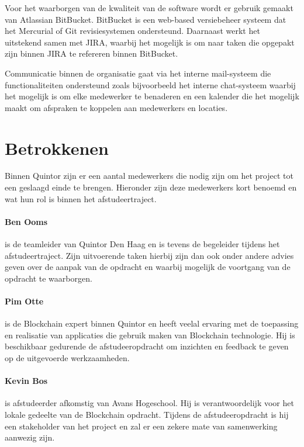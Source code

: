 Voor het waarborgen van de kwaliteit van de software wordt er gebruik gemaakt van Atlassian BitBucket. BitBucket is een web-based versiebeheer systeem dat het Mercurial of Git revisiesystemen ondersteund. Daarnaast werkt het uitstekend samen met JIRA, waarbij het mogelijk is om naar taken die opgepakt zijn binnen JIRA te refereren binnen BitBucket.

Communicatie binnen de organisatie gaat via het interne mail-systeem die functionaliteiten ondersteund zoals bijvoorbeeld het interne chat-systeem waarbij het mogelijk is om elke medewerker te benaderen en een kalender die het mogelijk maakt om afspraken te koppelen aan medewerkers en locaties.

\section{Betrokkenen}

Binnen Quintor zijn er een aantal medewerkers die nodig zijn om het project tot een geslaagd einde te brengen. Hieronder zijn deze medewerkers kort benoemd en wat hun rol is binnen het afstudeertraject.

\paragraph{Ben Ooms} \label{begeleider} is de teamleider van Quintor Den Haag en is tevens de begeleider tijdens het afstudeertraject. Zijn uitvoerende taken hierbij zijn dan ook onder andere advies geven over de aanpak van de opdracht en waarbij mogelijk de voortgang van de opdracht te waarborgen.

\paragraph{Pim Otte} \label{expert} is de Blockchain expert binnen Quintor en heeft veelal ervaring met de toepassing en realisatie van applicaties die gebruik maken van Blockchain technologie. Hij is beschikbaar gedurende de afstudeeropdracht om inzichten en feedback te geven op de uitgevoerde werkzaamheden.

\paragraph{Kevin Bos} is afstudeerder afkomstig van Avans Hogeschool. Hij is verantwoordelijk voor het lokale gedeelte van de Blockchain opdracht. Tijdens de afstudeeropdracht is hij een stakeholder van het project en zal er een zekere mate van samenwerking aanwezig zijn.